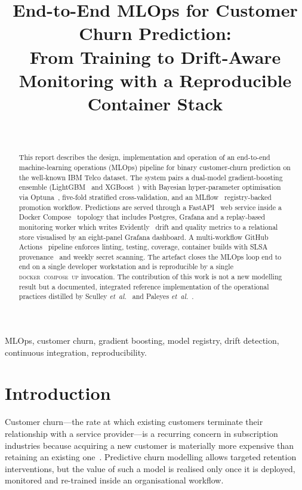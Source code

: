 \documentclass[conference,a4paper,10pt]{IEEEtran}
\title{End-to-End MLOps for Customer Churn Prediction:\\
       From Training to Drift-Aware Monitoring with a Reproducible
       Container Stack}
\author{\IEEEauthorblockN{Dan Waititu}\\
\IEEEauthorblockA{Lucerne University of Applied Sciences and Arts (HSLU)\\
MSc Module: Artificial Intelligence\\
\textit{danwwaititu@gmail.com}}}
\begin{document}
\maketitle

\begin{abstract}
This report describes the design, implementation and operation of an
end-to-end machine-learning operations (MLOps) pipeline for binary
customer-churn prediction on the well-known IBM Telco dataset. The
system pairs a dual-model gradient-boosting ensemble
(LightGBM~\cite{ke2017lightgbm} and XGBoost~\cite{chen2016xgboost}) with
Bayesian hyper-parameter optimisation via Optuna~\cite{akiba2019optuna},
five-fold stratified cross-validation, and an MLflow~\cite{mlflow_docs}
registry-backed promotion workflow. Predictions are served through a
FastAPI~\cite{fastapi_docs} web service inside a Docker
Compose~\cite{docker_compose} topology that includes Postgres, Grafana
and a replay-based monitoring worker which writes
Evidently~\cite{evidently_docs} drift and quality metrics to a relational
store visualised by an eight-panel Grafana dashboard. A multi-workflow
GitHub Actions~\cite{gha_docs} pipeline enforces linting, testing,
coverage, container builds with SLSA provenance~\cite{slsa_v1} and
weekly secret scanning. The artefact closes the MLOps loop end to end on
a single developer workstation and is reproducible by a single
\textsc{docker~compose~up} invocation. The contribution of this work is
not a new modelling result but a documented, integrated reference
implementation of the operational practices distilled by Sculley
\emph{et~al.}~\cite{sculley2015hidden} and Paleyes
\emph{et~al.}~\cite{paleyes2022deploy}.
\end{abstract}

\begin{IEEEkeywords}
MLOps, customer churn, gradient boosting, model registry, drift
detection, continuous integration, reproducibility.
\end{IEEEkeywords}

\section{Introduction}\label{sec:intro}

Customer churn---the rate at which existing customers terminate their
relationship with a service provider---is a recurring concern in
subscription industries because acquiring a new customer is materially
more expensive than retaining an existing one~\cite{verbeke2012churn}.
Predictive churn modelling allows targeted retention interventions, but
the value of such a model is realised only once it is deployed,
monitored and re-trained inside an organisational workflow.
\end{document}
